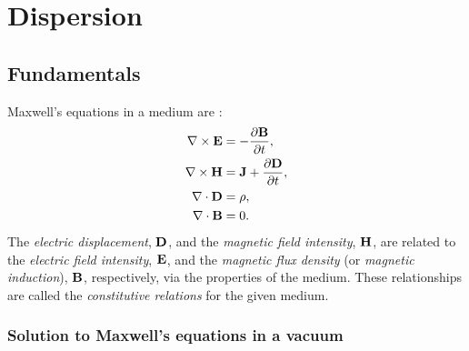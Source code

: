 \documentclass{book}
\newcommand{\pd}[2]{\frac{\partial {#1}}{\partial {#2}}}
\begin{document}
\section{Dispersion}

\subsection{Fundamentals}

Maxwell's equations in a medium are \citep[e.g.][]{Orfanidis2016}:
\begin{equation}
    \begin{aligned}
        \nabla \times {\bf E} &= -\pd{\bf B}{t}, \\
        \nabla \times {\bf H} &= {\bf J} + \pd{\bf D}{t}, \\
        \nabla \cdot {\bf D} &= \rho, \\
        \nabla \cdot {\bf B} &= 0.
    \end{aligned}
\end{equation}
The \textit{electric displacement}, ${\bf D}$, and the \textit{magnetic field intensity}, ${\bf H}$, are related to the \textit{electric field intensity}, ${\bf E}$, and the \textit{magnetic flux density} (or \textit{magnetic induction}), ${\bf B}$, respectively, via the properties of the medium.
These relationships are called the \textit{constitutive relations} for the given medium.

\subsubsection{Solution to Maxwell's equations in a vacuum}
\end{document}
